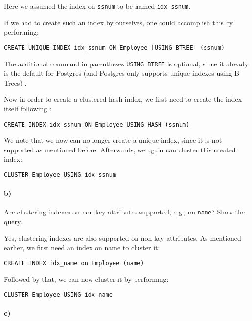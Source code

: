\documentclass[11pt]{scrartcl}
\begin{document}
Here we assumed the index on \texttt{ssnum} to be named \texttt{idx\_ssnum}.

If we had to create such an index by ourselves, one could accomplish this by performing:
\begin{lstlisting}[style=dbtsql]
CREATE UNIQUE INDEX idx_ssnum ON Employee [USING BTREE] (ssnum)
\end{lstlisting}

The additional command in parentheses \texttt{USING BTREE} is optional, since it already is the default for Postgres
(and Postgres only supports unique indexes using B-Trees) \cite{PostgreSQL2024Unique}.

Now in order to create a clustered hash index, we first need to create the index itself following
\cite{PostgreSQL2024IndexTypes}:

\begin{lstlisting}[style=dbtsql]
CREATE INDEX idx_ssnum ON Employee USING HASH (ssnum)
\end{lstlisting}

We note that we now can no longer create a unique index, since it is not supported as mentioned before.
Afterwards, we again can cluster this created index:

\begin{lstlisting}[style=dbtsql]
CLUSTER Employee USING idx_ssnum
\end{lstlisting}

\paragraph{b)}

Are clustering indexes on non-key attributes supported, e.g., on \texttt{name}? Show the query.

Yes, clustering indexes are also supported on non-key attributes.
As mentioned earlier, we first need an index on name to cluster it:

\begin{lstlisting}[style=dbtsql]
CREATE INDEX idx_name on Employee (name)
\end{lstlisting}

Followed by that, we can now cluster it by performing:

\begin{lstlisting}[style=dbtsql]
CLUSTER Employee USING idx_name
\end{lstlisting}

\paragraph{c)}
\end{document}
